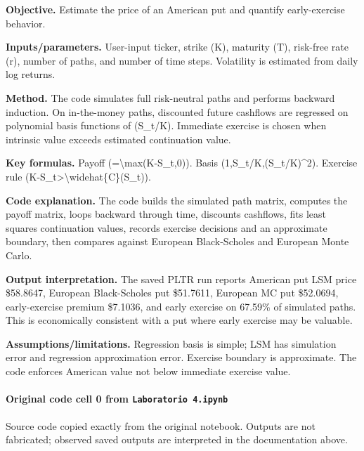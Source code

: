 \documentclass[
  11pt,
]{article}
\begin{document}
\textbf{Objective.} Estimate the price of an American put and quantify early-exercise behavior.

\textbf{Inputs/parameters.} User-input ticker, strike (K), maturity (T), risk-free rate (r), number of paths, and number of time steps. Volatility is estimated from daily log returns.

\textbf{Method.} The code simulates full risk-neutral paths and performs backward induction. On in-the-money paths, discounted future cashflows are regressed on polynomial basis functions of (S\_t/K). Immediate exercise is chosen when intrinsic value exceeds estimated continuation value.

\textbf{Key formulas.} Payoff (=\textbackslash max(K-S\_t,0)). Basis (1,S\_t/K,(S\_t/K)\^{}2). Exercise rule (K-S\_t\textgreater\textbackslash widehat\{C\}(S\_t)).

\textbf{Code explanation.} The code builds the simulated path matrix, computes the payoff matrix, loops backward through time, discounts cashflows, fits least squares continuation values, records exercise decisions and an approximate boundary, then compares against European Black-Scholes and European Monte Carlo.

\textbf{Output interpretation.} The saved PLTR run reports American put LSM price \$58.8647, European Black-Scholes put \$51.7611, European MC put \$52.0694, early-exercise premium \$7.1036, and early exercise on 67.59\% of simulated paths. This is economically consistent with a put where early exercise may be valuable.

\textbf{Assumptions/limitations.} Regression basis is simple; LSM has simulation error and regression approximation error. Exercise boundary is approximate. The code enforces American value not below immediate exercise value.

\paragraph{\texorpdfstring{Original code cell 0 from \texttt{Laboratorio\ 4.ipynb}}{Original code cell 0 from Laboratorio 4.ipynb}}\label{original-code-cell-0-from-laboratorio-4ipynb}

Source code copied exactly from the original notebook. Outputs are not fabricated; observed saved outputs are interpreted in the documentation above.
\end{document}

